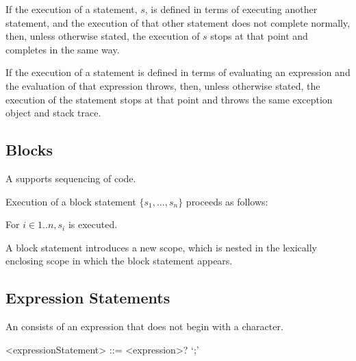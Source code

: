 \documentclass[makeidx]{article}
\begin{document}
{\LMHash{}%
If the execution of a statement, $s$,
is defined in terms of executing another statement,
and the execution of that other statement does not complete normally,
then, unless otherwise stated, the execution of $s$ stops
at that point and completes in the same way.

\LMHash{}%
If the execution of a statement is defined in terms of evaluating an expression
and the evaluation of that expression throws,
then, unless otherwise stated, the execution of the statement stops
at that point and throws the same exception object and stack trace.



\subsection{Blocks}

\LMHash{}%
A  supports sequencing of code.

\LMHash{}%
Execution of a block statement $\{s_1, \ldots, s_n\}$ proceeds as follows:

\LMHash{}%
For $i \in 1 .. n, s_i$ is executed.

\LMHash{}%
A block statement introduces a new scope, which is nested in the lexically enclosing scope in which the block statement appears.


\subsection{Expression Statements}

\LMHash{}%
An  consists of an expression that does not
begin with a \lit{\{} character.

\begin{grammar}
<expressionStatement> ::= <expression>? `;'
\end{grammar}

}
\end{document}
